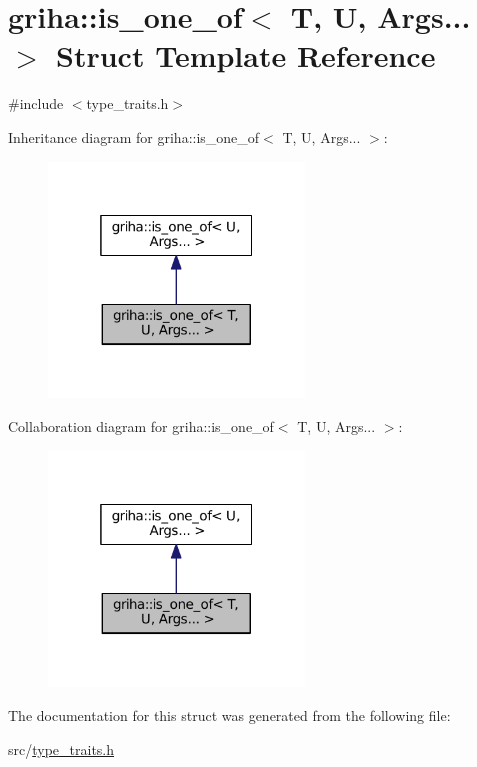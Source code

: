 \hypertarget{structgriha_1_1is__one__of_3_01_t_00_01_u_00_01_args_8_8_8_01_4}{}\section{griha\+:\+:is\+\_\+one\+\_\+of$<$ T, U, Args... $>$ Struct Template Reference}
\label{structgriha_1_1is__one__of_3_01_t_00_01_u_00_01_args_8_8_8_01_4}


{\ttfamily \#include $<$type\+\_\+traits.\+h$>$}



Inheritance diagram for griha\+:\+:is\+\_\+one\+\_\+of$<$ T, U, Args... $>$\+:
\nopagebreak
\begin{figure}[H]
\begin{center}
\leavevmode
\includegraphics[width=193pt]{structgriha_1_1is__one__of_3_01_t_00_01_u_00_01_args_8_8_8_01_4__inherit__graph}
\end{center}
\end{figure}


Collaboration diagram for griha\+:\+:is\+\_\+one\+\_\+of$<$ T, U, Args... $>$\+:
\nopagebreak
\begin{figure}[H]
\begin{center}
\leavevmode
\includegraphics[width=193pt]{structgriha_1_1is__one__of_3_01_t_00_01_u_00_01_args_8_8_8_01_4__coll__graph}
\end{center}
\end{figure}


The documentation for this struct was generated from the following file\+:\begin{DoxyCompactItemize}
\item 
src/\hyperlink{type__traits_8h}{type\+\_\+traits.\+h}\end{DoxyCompactItemize}
